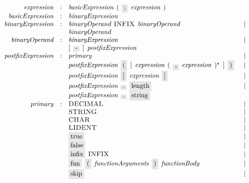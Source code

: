 \begin{figure}[t]
  \[
    \begin{array}{rcll}
      \defterm{expression}        & : & \nonterm{basicExpression}\s(\s\term{;}\s\nonterm{expression}\s)&\\
      \defterm{basicExpression}   & : & \nonterm{binaryExpression}&\\
      \defterm{binaryExpression}  & : & \nonterm{binaryOperand}\s\token{INFIX}\s\nonterm{binaryOperand}&\alt\\
                                  &   & \nonterm{binaryOperand}&\\
      \defterm{binaryOperand}     & : & \nonterm{binaryExpression}&\alt\\
                                  &   & [\s\term{-}\s]\s\nonterm{postfixExpression}&\\
      \defterm{postfixExpression} & : & \nonterm{primary}&\alt\\
                                  &   & \nonterm{postfixExpression}\s\term{(}\s[\s\nonterm{expression}\s(\s\term{,}\s\nonterm{expression}\s)^\star\s]\s\term{)}&\alt\\
                                  &   & \nonterm{postfixExpression}\s\term{[}\s\nonterm{expression}\s\term{]}&\alt\\
                                  &   & \nonterm{postfixExpression}\s\term{.}\s\term{length}&\alt\\
                                  &   & \nonterm{postfixExpression}\s\term{.}\s\term{string}&\\      
      \defterm{primary}           & : & \token{DECIMAL}&\alt\\
                                  &   & \token{STRING}&\alt\\
                                  &   & \token{CHAR}&\alt\\
                                  &   & \token{LIDENT}&\alt\\
                                  &   & \term{true}&\alt\\
                                  &   & \term{false}&\alt\\
                                  &   & \term{infix}\s\token{INFIX}&\alt\\
                                  &   & \term{fun}\s\term{(}\s\nonterm{functionArguments}\s\term{)}\s\nonterm{functionBody}&\alt\\
                                  &   & \term{skip}&\alt\\

\end{array}\]
\end{figure}
